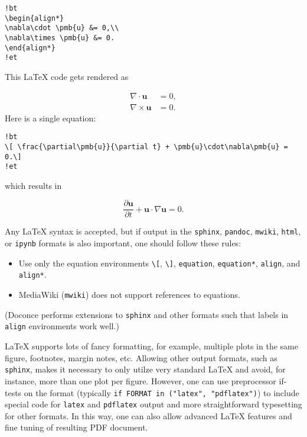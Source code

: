 \documentclass[%
oneside,                 %
final,                   %
10pt]{article}
\newenvironment{noticeshaded}
{\def\FrameCommand{\fboxsep=3mm\colorbox{noticebackground}}
 \MakeFramed {\advance\hsize-\width \FrameRestore}}{\endMakeFramed}
\newenvironment{notice_colors1admon}[1][Notice]{
\begin{noticeshaded}
\noindent
\texttt{[image: latex\_figs/notice]}\ \ \   \textbf{#1}\\ \par
\nobreak\noindent\ignorespaces
}
{
\end{noticeshaded}
}
\begin{document}
\begin{Verbatim}[numbers=none,fontsize=\fontsize{9pt}{9pt},baselinestretch=0.85,xleftmargin=0mm]
!bt
\begin{align*}
\nabla\cdot \pmb{u} &= 0,\\ 
\nabla\times \pmb{u} &= 0.
\end{align*}
!et
\end{Verbatim}

This {\LaTeX} code gets rendered as

\begin{align*}
\nabla\cdot \pmb{u} &= 0,\\ 
\nabla\times \pmb{u} &= 0.
\end{align*}
Here is a single equation:

\begin{Verbatim}[numbers=none,fontsize=\fontsize{9pt}{9pt},baselinestretch=0.85,xleftmargin=0mm]
!bt
\[ \frac{\partial\pmb{u}}{\partial t} + \pmb{u}\cdot\nabla\pmb{u} = 0.\]
!et
\end{Verbatim}
which results in

\[ \frac{\partial\pmb{u}}{\partial t} + \pmb{u}\cdot\nabla\pmb{u} = 0.\]

Any {\LaTeX} syntax is accepted, but if output in the \Verb!sphinx!, \Verb!pandoc!,
\Verb!mwiki!, \Verb!html!, or \Verb!ipynb! formats
is also important, one should follow these rules:

\begin{itemize}
  \item Use only the equation environments \Verb!\[!, \Verb!\]!,
    \Verb!equation!, \Verb!equation*!, \Verb!align!, and \Verb!align*!.

  \item MediaWiki (\Verb!mwiki!) does not support references to equations.
\end{itemize}

\noindent
(Doconce performs extensions to \Verb!sphinx! and other formats such that
labels in \Verb!align! environments work well.)


\begin{notice_colors1admon}[Notice]
{\LaTeX} supports lots of fancy formatting, for example, multiple
plots in the same figure, footnotes, margin notes, etc.
Allowing other output formats, such as \Verb!sphinx!, makes it necessary
to only utilze very standard {\LaTeX} and avoid, for instance, more than
one plot per figure. However, one can use preprocessor if-tests on
the format (typically \Verb!if FORMAT in ("latex", "pdflatex")!) to
include special code for \Verb!latex! and \Verb!pdflatex! output and more
straightforward typesetting for other formats. In this way, one can
also allow advanced {\LaTeX} features and fine tuning of resulting
PDF document.
\end{notice_colors1admon}
\end{document}

